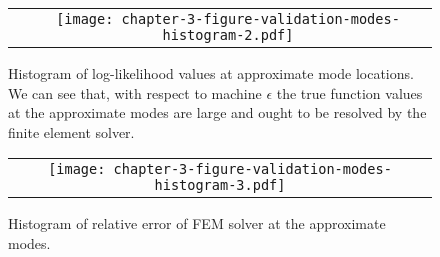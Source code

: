 \begin{figure}
\begin{tabular}{cc}
\begin{minipage}{0.50\textwidth}
      \label{fig:modes-scatterplot-2}
    \end{minipage} &
    \begin{minipage}{0.50\textwidth}
      \centering
      \texttt{[image: chapter-3-figure-validation-modes-histogram-2.pdf]}
      \caption{Histogram of log-likelihood values at approximate mode
        locations.  We can see that, with respect to machine
        $\epsilon$ the true function values at the approximate modes
        are large and ought to be resolved by the finite element
        solver.}
      \label{fig:modes-histogram-2}
    \end{minipage}
  \end{tabular}
\end{figure}

\begin{figure}
  \begin{tabular}{c}
    \begin{minipage}{0.90\textwidth}
      \centering
      \texttt{[image: chapter-3-figure-validation-modes-histogram-3.pdf]}
      \caption{Histogram of relative error of FEM solver at the
        approximate modes.}
      \label{fig:modes-histogram-3}
    \end{minipage}
  \end{tabular}
\end{figure}